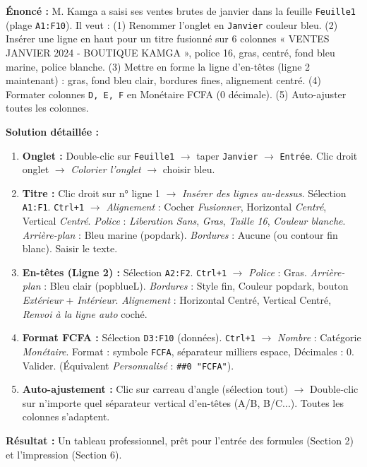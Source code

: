 \documentclass[11pt]{article}
\begin{document}
\begin{exoresolu}
\textbf{Énoncé :} M. Kamga a saisi ses ventes brutes de janvier dans la feuille \texttt{Feuille1} (plage \texttt{A1:F10}). Il veut : (1) Renommer l'onglet en \texttt{Janvier} couleur bleu. (2) Insérer une ligne en haut pour un titre fusionné sur 6 colonnes « VENTES JANVIER 2024 - BOUTIQUE KAMGA », police 16, gras, centré, fond bleu marine, police blanche. (3) Mettre en forme la ligne d'en-têtes (ligne 2 maintenant) : gras, fond bleu clair, bordures fines, alignement centré. (4) Formater colonnes \texttt{D, E, F} en Monétaire FCFA (0 décimale). (5) Auto-ajuster toutes les colonnes.

\textbf{Solution détaillée :}
\begin{enumerate}
    \item \textbf{Onglet :} Double-clic sur \texttt{Feuille1} $\to$ taper \texttt{Janvier} $\to$ \texttt{Entrée}. Clic droit onglet $\to$ \textit{Colorier l'onglet} $\to$ choisir bleu.
    \item \textbf{Titre :} Clic droit sur n° ligne 1 $\to$ \textit{Insérer des lignes au-dessus}. Sélection \texttt{A1:F1}. \texttt{Ctrl+1} $\to$ \textit{Alignement} : Cocher \textit{Fusionner}, Horizontal \textit{Centré}, Vertical \textit{Centré}. \textit{Police} : \textit{Liberation Sans}, \textit{Gras}, \textit{Taille 16}, \textit{Couleur blanche}. \textit{Arrière-plan} : Bleu marine (popdark). \textit{Bordures} : Aucune (ou contour fin blanc). Saisir le texte.
    \item \textbf{En-têtes (Ligne 2) :} Sélection \texttt{A2:F2}. \texttt{Ctrl+1} $\to$ \textit{Police} : Gras. \textit{Arrière-plan} : Bleu clair (popblueL). \textit{Bordures} : Style fin, Couleur popdark, bouton \textit{Extérieur} + \textit{Intérieur}. \textit{Alignement} : Horizontal Centré, Vertical Centré, \textit{Renvoi à la ligne auto} coché.
    \item \textbf{Format FCFA :} Sélection \texttt{D3:F10} (données). \texttt{Ctrl+1} $\to$ \textit{Nombre} : Catégorie \textit{Monétaire}. Format : symbole \texttt{FCFA}, séparateur milliers espace, Décimales : 0. Valider. (Équivalent \textit{Personnalisé} : \texttt{\#\#0 "FCFA"}).
    \item \textbf{Auto-ajustement :} Clic sur carreau d'angle (sélection tout) $\to$ Double-clic sur n'importe quel séparateur vertical d'en-têtes (A/B, B/C...). Toutes les colonnes s'adaptent.
\end{enumerate}
\textbf{Résultat :} Un tableau professionnel, prêt pour l'entrée des formules (Section 2) et l'impression (Section 6).
\end{exoresolu}
\end{document}
